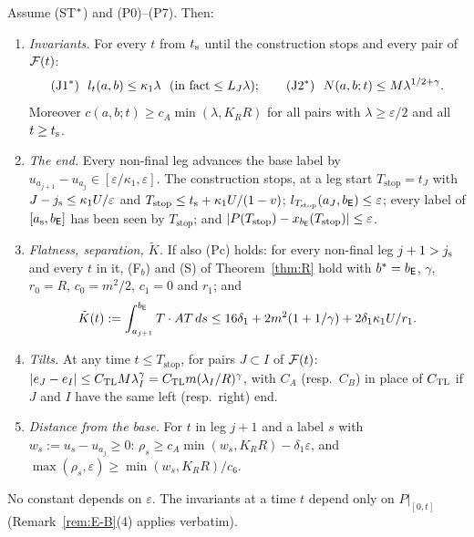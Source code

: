\begin{theorem}\label{thm:Estar}
Assume \textup{(ST$^{*}$)} and \textup{(P0)}--\textup{(P7)}. Then:
\begin{enumerate}
\item[(a)] \emph{Invariants.} For every $t$ from $t_{\mathrm s}$ until the construction stops and every pair of $\mathcal F(t)$:
\begin{equation}\label{eq:Estar-J}
\textup{(J1$^{*}$)}\ \ l_t(a,b)\le\kappa_1\lambda\ \ (\text{in fact}\le L_J\lambda);\qquad
\textup{(J2$^{*}$)}\ \ N(a,b;t)\le M\lambda^{1/2+\gamma}.
\end{equation}
Moreover $c(a,b;t)\ge c_A\min(\lambda,K_RR)$ for all pairs with $\lambda\ge\varepsilon/2$ and all $t\ge t_{\mathrm s}$.
\item[(b)] \emph{The end.} Every non-final leg advances the base label by $u_{a_{j+1}}-u_{a_j}\in[\varepsilon/\kappa_1,\varepsilon]$.
The construction stops, at a leg start $T_{\mathrm{stop}}=t_J$ with $J-j_{\mathrm s}\le\kappa_1U/\varepsilon$ and
$T_{\mathrm{stop}}\le t_{\mathrm s}+\kappa_1U/(1-v)$; $l_{T_{\mathrm{stop}}}(a_J,b_{\mathsf E})\le\varepsilon$; every label of
$[a_{\mathrm s},b_{\mathsf E}]$ has been seen by $T_{\mathrm{stop}}$; and $|P(T_{\mathrm{stop}})-x_{b_{\mathsf E}}(T_{\mathrm{stop}})|\le\varepsilon$.
\item[(c)] \emph{Flatness, separation, $\tilde K$.} If also \textup{(Pc)} holds: for every non-final leg $j+1>j_{\mathrm s}$ and every $t$ in
it, \textup{(F$_b$)} and \textup{(S)} of Theorem~\ref{thm:R} hold with $b^*=b_{\mathsf E}$, $\gamma$, $r_0=R$, $c_0=m^2/2$, $c_1=0$ and
$r_1$; and
\[
\tilde K(t):=\int_{a_{j+1}}^{b_{\mathsf E}}T\cdot AT\,ds\le16\delta_1+2m^2(1+1/\gamma)+2\delta_1\kappa_1U/r_1 .
\]
\item[(d)] \emph{Tilts.} At any time $t\le T_{\mathrm{stop}}$, for pairs $J\subset I$ of $\mathcal F(t)$:
$|e_J-e_I|\le C_{\mathrm{TL}} M\lambda_I^\gamma=C_{\mathrm{TL}} m(\lambda_I/R)^\gamma$, with $C_A$ (resp.\ $C_B$) in place of $C_{\mathrm{TL}}$ if $J$ and $I$ have
the same left (resp.\ right) end.
\item[(e)] \emph{Distance from the base.} For $t$ in leg $j+1$ and a label $s$ with $w_s:=u_s-u_{a_j}\ge0$:
$\rho_s\ge c_A\min(w_s,K_RR)-\delta_1\varepsilon$, and $\max(\rho_s,\varepsilon)\ge\min(w_s,K_RR)/c_6$.
\end{enumerate}
No constant depends on $\varepsilon$. The invariants at a time $t$ depend only on $P|_{[0,t]}$ (Remark~\ref{rem:E-B}(4) applies
verbatim).
\end{theorem}

